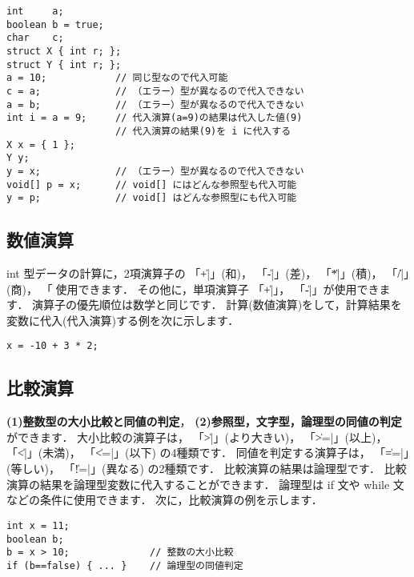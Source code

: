 \begin{mylist}
\begin{verbatim}
int     a;
boolean b = true;
char    c;
struct X { int r; };
struct Y { int r; };
a = 10;            // 同じ型なので代入可能
c = a;             // （エラー）型が異なるので代入できない
a = b;             // （エラー）型が異なるので代入できない
int i = a = 9;     // 代入演算(a=9)の結果は代入した値(9)
                   // 代入演算の結果(9)を i に代入する
X x = { 1 };
Y y;
y = x;             // （エラー）型が異なるので代入できない
void[] p = x;      // void[] にはどんな参照型も代入可能
y = p;             // void[] はどんな参照型にも代入可能
\end{verbatim}
\end{mylist}

\subsection{数値演算}

int 型データの計算に，2項演算子の
「\|+|」(和)，
「\|-|」(差)，
「\|*|」(積)，
「\|/|」(商)，
「\|%
が使用できます．
その他に，単項演算子
「\|+|」，
「\|-|」が使用できます．
演算子の優先順位は数学と同じです．
計算(数値演算)をして，計算結果を変数に代入(代入演算)する例を次に示します．

\begin{mylist}
\begin{verbatim}
x = -10 + 3 * 2;
\end{verbatim}
\end{mylist}

\subsection{比較演算}

{\bf (1)整数型の大小比較と同値の判定}，
{\bf (2)参照型，文字型，論理型の同値の判定}ができます．
大小比較の演算子は，
「\|>|」(より大きい)，
「\|>=|」(以上)，
「\|<|」(未満)，
「\|<=|」(以下) の4種類です．
同値を判定する演算子は，
「\|==|」(等しい)，
「\|!=|」(異なる)
の2種類です．
比較演算の結果は論理型です．
比較演算の結果を論理型変数に代入することができます．
論理型は if 文や while 文などの条件に使用できます．
次に，比較演算の例を示します．

\begin{mylist}
\begin{verbatim}
int x = 11;
boolean b;
b = x > 10;              // 整数の大小比較
if (b==false) { ... }    // 論理型の同値判定
\end{verbatim}
\end{mylist}

